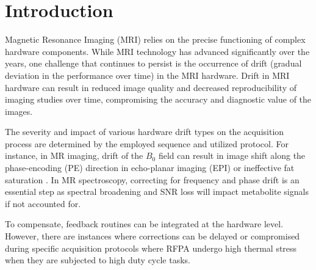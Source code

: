 \section{Introduction}\label{sec1}

Magnetic Resonance Imaging (MRI) relies on the precise functioning of complex hardware components. While MRI technology has advanced significantly over the years, one challenge that continues to persist is the occurrence of drift (gradual deviation in the performance over time) in the MRI hardware. Drift in MRI hardware can result in reduced image quality and decreased reproducibility of imaging studies over time, compromising the accuracy and diagnostic value of the images.

The severity and impact of various hardware drift types on the acquisition process are determined by the employed sequence and utilized protocol. For instance, in MR imaging, drift of the $B_0$ field can result in image shift along the phase-encoding (PE) direction in echo-planar imaging (EPI) \cite{thesen2003absolute} or ineffective fat saturation \cite{Benner2006}. In MR spectroscopy, correcting for frequency and phase drift is an essential step as spectral broadening and SNR loss will impact metabolite signals if not accounted for.\cite{Near2015, Steve2021, Lange2011}

 To compensate, feedback routines can be integrated at the hardware level.  However, there are instances where corrections can be delayed or compromised during specific acquisition protocols where RFPA undergo high thermal stress when they are subjected to high duty cycle tasks. 

